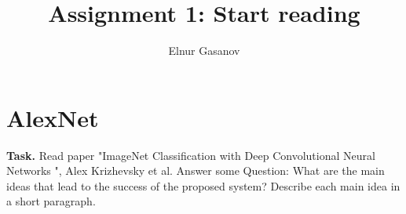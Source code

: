 \documentclass{article}
\title{Assignment 1: Start reading}
\author{Elnur Gasanov}
\date{}
\begin{document}
\maketitle

\section{AlexNet}

{\bfseries Task.} Read paper "ImageNet Classification with Deep Convolutional Neural Networks ",  Alex Krizhevsky et al. Answer some Question: What are the main ideas that lead to the success of the proposed system? Describe each main idea in a short paragraph.
\end{document}

